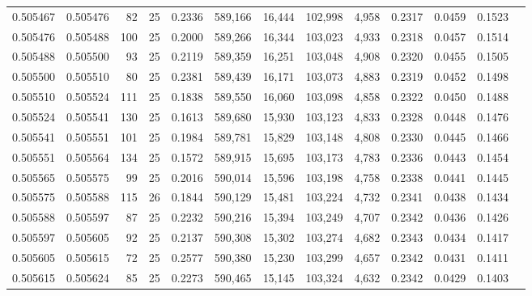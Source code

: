 \begin{tabular}{rrrrrrrrrrrrr}
0.505467 & 0.505476 &  82 &  25 &                                     0.2336 & 589,166 &  16,444 & 102,998 &   4,958 & 0.2317 & 0.0459 & 0.1523 \\
0.505476 & 0.505488 & 100 &  25 &                                     0.2000 & 589,266 &  16,344 & 103,023 &   4,933 & 0.2318 & 0.0457 & 0.1514 \\
0.505488 & 0.505500 &  93 &  25 &                                     0.2119 & 589,359 &  16,251 & 103,048 &   4,908 & 0.2320 & 0.0455 & 0.1505 \\
0.505500 & 0.505510 &  80 &  25 &                                     0.2381 & 589,439 &  16,171 & 103,073 &   4,883 & 0.2319 & 0.0452 & 0.1498 \\
0.505510 & 0.505524 & 111 &  25 &                                     0.1838 & 589,550 &  16,060 & 103,098 &   4,858 & 0.2322 & 0.0450 & 0.1488 \\
0.505524 & 0.505541 & 130 &  25 &                                     0.1613 & 589,680 &  15,930 & 103,123 &   4,833 & 0.2328 & 0.0448 & 0.1476 \\
0.505541 & 0.505551 & 101 &  25 &                                     0.1984 & 589,781 &  15,829 & 103,148 &   4,808 & 0.2330 & 0.0445 & 0.1466 \\
0.505551 & 0.505564 & 134 &  25 &                                     0.1572 & 589,915 &  15,695 & 103,173 &   4,783 & 0.2336 & 0.0443 & 0.1454 \\
0.505565 & 0.505575 &  99 &  25 &                                     0.2016 & 590,014 &  15,596 & 103,198 &   4,758 & 0.2338 & 0.0441 & 0.1445 \\
0.505575 & 0.505588 & 115 &  26 &                                     0.1844 & 590,129 &  15,481 & 103,224 &   4,732 & 0.2341 & 0.0438 & 0.1434 \\
0.505588 & 0.505597 &  87 &  25 &                                     0.2232 & 590,216 &  15,394 & 103,249 &   4,707 & 0.2342 & 0.0436 & 0.1426 \\
0.505597 & 0.505605 &  92 &  25 &                                     0.2137 & 590,308 &  15,302 & 103,274 &   4,682 & 0.2343 & 0.0434 & 0.1417 \\
0.505605 & 0.505615 &  72 &  25 &                                     0.2577 & 590,380 &  15,230 & 103,299 &   4,657 & 0.2342 & 0.0431 & 0.1411 \\
0.505615 & 0.505624 &  85 &  25 &                                     0.2273 & 590,465 &  15,145 & 103,324 &   4,632 & 0.2342 & 0.0429 & 0.1403 \\

\end{tabular}
